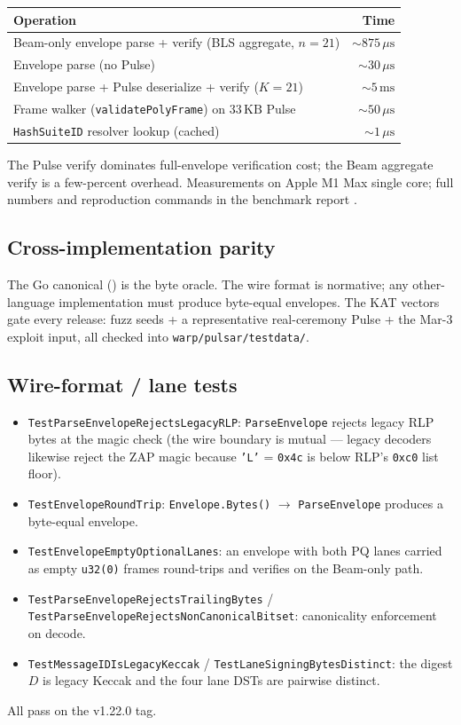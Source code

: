 \begin{tabular}{@{}lr@{}}
  \toprule
  Operation & Time \\
  \midrule
  Beam-only envelope parse + verify (BLS aggregate, $n=21$) & $\sim 875\,\mu\mathrm{s}$ \\
  Envelope parse (no Pulse) & $\sim 30\,\mu\mathrm{s}$ \\
  Envelope parse + Pulse deserialize + verify ($K=21$) & $\sim 5\,\mathrm{ms}$ \\
  Frame walker (\texttt{validatePolyFrame}) on $33\,\mathrm{KB}$ Pulse & $\sim 50\,\mu\mathrm{s}$ \\
  \texttt{HashSuiteID} resolver lookup (cached) & $\sim 1\,\mu\mathrm{s}$ \\
  \bottomrule
\end{tabular}

The Pulse verify dominates full-envelope verification cost; the Beam aggregate verify is a few-percent overhead. Measurements on Apple M1 Max single core; full numbers and reproduction commands in the benchmark report \cite{luxbenchmarks}.

\subsection{Cross-implementation parity}

The Go canonical (\cite{warpgo}) is the byte oracle. The wire format is normative; any other-language implementation must produce byte-equal envelopes. The KAT vectors gate every release: fuzz seeds + a representative real-ceremony Pulse + the Mar-3 exploit input, all checked into \texttt{warp/pulsar/testdata/}.

\subsection{Wire-format / lane tests}

\begin{itemize}[leftmargin=2em,nosep]
  \item \texttt{TestParseEnvelopeRejectsLegacyRLP}: \texttt{ParseEnvelope} rejects legacy RLP bytes at the magic check (the wire boundary is mutual --- legacy decoders likewise reject the ZAP magic because \texttt{'L'} = \texttt{0x4c} is below RLP's \texttt{0xc0} list floor).
  \item \texttt{TestEnvelopeRoundTrip}: \texttt{Envelope.Bytes()} $\to$ \texttt{ParseEnvelope} produces a byte-equal envelope.
  \item \texttt{TestEnvelopeEmptyOptionalLanes}: an envelope with both PQ lanes carried as empty \texttt{u32(0)} frames round-trips and verifies on the Beam-only path.
  \item \texttt{TestParseEnvelopeRejectsTrailingBytes} / \texttt{TestParseEnvelopeRejectsNonCanonicalBitset}: canonicality enforcement on decode.
  \item \texttt{TestMessageIDIsLegacyKeccak} / \texttt{TestLaneSigningBytesDistinct}: the digest $D$ is legacy Keccak and the four lane DSTs are pairwise distinct.
\end{itemize}

All pass on the v1.22.0 tag.
